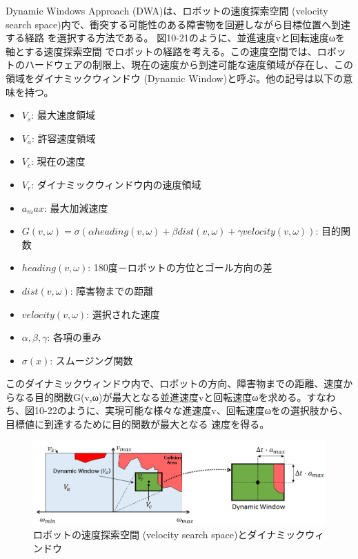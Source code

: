 Dynamic Windows Approach (DWA)は、ロボットの速度探索空間 (velocity search space)内で、衝突する可能性のある障害物を回避しながら目標位置へ到達する経路  を選択する方法である。
 図10-21のように、並進速度vと回転速度ωを軸とする速度探索空間 でロボットの経路を考える。この速度空間では、ロボットのハードウェアの制限上、現在の速度から到達可能な速度領域が存在し、この領域をダイナミックウィンドウ (Dynamic Window)と呼ぶ。他の記号は以下の意味を持つ。

\begin{itemize}
\item $V_s$: 最大速度領域
\item $V_a$: 許容速度領域
\item $V_c$: 現在の速度
\item $V_r$: ダイナミックウィンドウ内の速度領域
\item $a_max$: 最大加減速度
\end{itemize}

\begin{itemize}
\item  $G(v,\omega) = \sigma(\alpha heading(v,\omega) + \beta dist(v,\omega) + \gamma velocity(v,\omega))$: 目的関数
\item $heading(v,\omega)$: 180度－ロボットの方位とゴール方向の差
\item $dist(v,\omega)$: 障害物までの距離
\item $velocity(v,\omega)$: 選択された速度
\item $\alpha, \beta, \gamma$: 各項の重み
\item $\sigma(x)$: スムージング関数
\end{itemize}

このダイナミックウィンドウ内で、ロボットの方向、障害物までの距離、速度からなる目的関数G(v,ω)が最大となる並進速度vと回転速度ωを求める。すなわち、図10-22のように、実現可能な様々な進速度v、回転速度ωをの選択肢から、目標値に到達するために目的関数が最大となる  速度を得る。

\begin{figure}[htp]
  \centering
  \includegraphics[width=\columnwidth]{pictures/chapter10/pic_10_21.png}
  \caption{ロボットの速度探索空間 (velocity search space)とダイナミックウィンドウ}
\end{figure}

